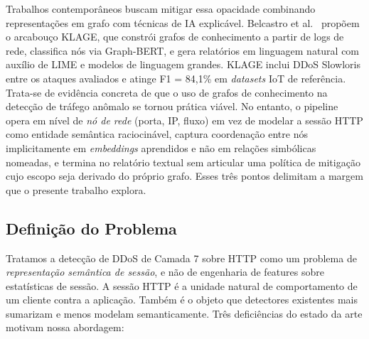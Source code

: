 \documentclass[preprint,12pt]{elsarticle}
\begin{document}
Trabalhos contemporâneos buscam mitigar essa opacidade combinando representações em grafo com técnicas de IA explicável. Belcastro et al.~\cite{belcastro2025klage} propõem o arcabouço KLAGE, que constrói grafos de conhecimento a partir de logs de rede, classifica nós via Graph-BERT, e gera relatórios em linguagem natural com auxílio de LIME e modelos de linguagem grandes. KLAGE inclui DDoS Slowloris entre os ataques avaliados e atinge F1 = 84,1\% em \emph{datasets} IoT de referência. Trata-se de evidência concreta de que o uso de grafos de conhecimento na detecção de tráfego anômalo se tornou prática viável. No entanto, o pipeline opera em nível de \emph{nó de rede} (porta, IP, fluxo) em vez de modelar a sessão HTTP como entidade semântica raciocinável, captura coordenação entre nós implicitamente em \emph{embeddings} aprendidos e não em relações simbólicas nomeadas, e termina no relatório textual sem articular uma política de mitigação cujo escopo seja derivado do próprio grafo. Esses três pontos delimitam a margem que o presente trabalho explora.

\subsection{Definição do Problema}

Tratamos a detecção de DDoS de Camada 7 sobre HTTP como um problema de \emph{representação semântica de sessão}, e não de engenharia de features sobre estatísticas de sessão. A sessão HTTP é a unidade natural de comportamento de um cliente contra a aplicação. Também é o objeto que detectores existentes mais sumarizam e menos modelam semanticamente. Três deficiências do estado da arte motivam nossa abordagem:
\end{document}
